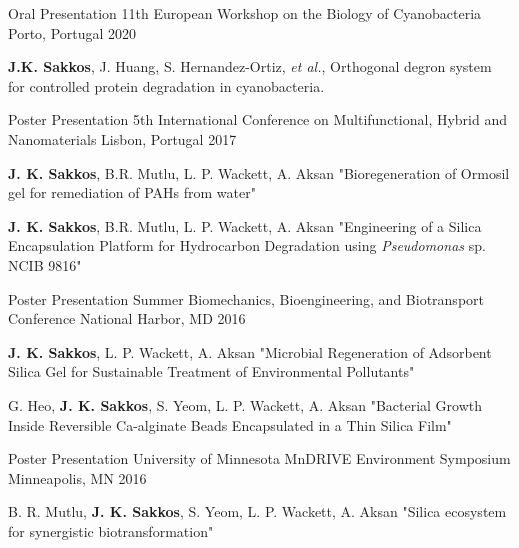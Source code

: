 


\begin{cventries}


\cventry
{Oral Presentation}
{11th European Workshop on the Biology of Cyanobacteria}
{Porto, Portugal} %
{2020} %
{ %
	\begin{cvitems}
		\item {\textbf{J.K. Sakkos}, J. Huang, S. Hernandez-Ortiz, \textit{et al.}, Orthogonal degron system for controlled protein degradation in cyanobacteria.}
	\end{cvitems}
}

\cventry
{Poster Presentation}
{5th International Conference on Multifunctional, Hybrid and Nanomaterials}
{Lisbon, Portugal} %
{2017} %
{ %
\begin{cvitems}
	\item {\textbf{J. K. Sakkos}, B.R. Mutlu, L. P. Wackett, A. Aksan "Bioregeneration of Ormosil gel for remediation of PAHs from water"}
	\item {\textbf{J. K. Sakkos}, B.R. Mutlu, L. P. Wackett, A. Aksan "Engineering of a Silica Encapsulation Platform for Hydrocarbon Degradation using \textit{Pseudomonas} sp. NCIB 9816"}
\end{cvitems}
}

\cventry
{Poster Presentation}
{Summer Biomechanics, Bioengineering, and Biotransport Conference}
{National Harbor, MD} %
{2016} %
{ %
	\begin{cvitems}
		\item {\textbf{J. K. Sakkos}, L. P. Wackett, A. Aksan "Microbial Regeneration of Adsorbent Silica Gel for Sustainable Treatment of Environmental Pollutants"}
		\item {G. Heo, \textbf{J. K. Sakkos}, S. Yeom, L. P. Wackett, A. Aksan "Bacterial Growth Inside Reversible Ca-alginate Beads Encapsulated in a Thin Silica Film"}
	\end{cvitems}
}
\cventry
{Poster Presentation}
{University of Minnesota MnDRIVE Environment Symposium}
{Minneapolis, MN} %
{2016} %
{ %
	\begin{cvitems}
		\item {B. R. Mutlu, \textbf{J. K. Sakkos}, S. Yeom, L. P. Wackett, A. Aksan "Silica ecosystem for synergistic biotransformation"}
	\end{cvitems}
}
	

\end{cventries}
